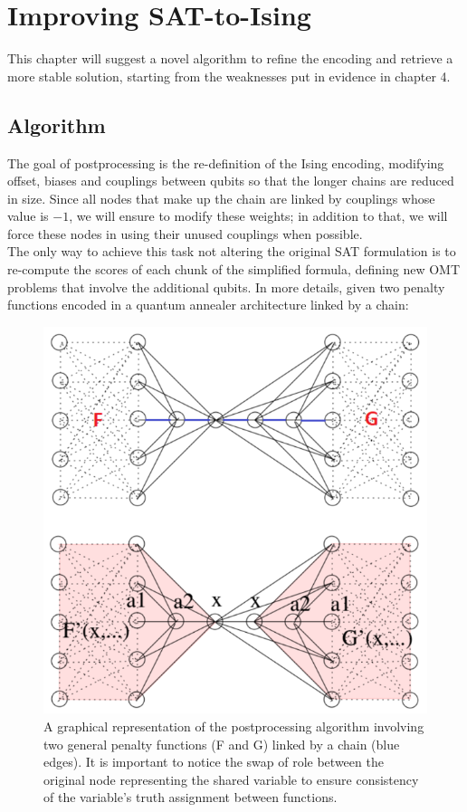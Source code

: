 \chapter{Improving SAT-to-Ising}
\label{cha:QAcore}

This chapter will suggest a novel algorithm to refine the encoding and retrieve a more stable solution, starting from the weaknesses put in evidence in chapter 4. 

\section{Algorithm}

The goal of postprocessing is the re-definition of the Ising encoding, modifying offset, biases and couplings between qubits so that the longer chains are reduced in size. Since all nodes that make up the chain are linked by couplings whose value is $-1$, we will ensure to modify these weights; in addition to that, we will force these nodes in using their unused couplings when possible. \\
The only way to achieve this task not altering the original SAT formulation is to re-compute the scores of each chunk of the simplified formula, defining new OMT problems that involve the additional qubits. In more details, given two penalty functions encoded in a quantum annealer architecture linked by a chain:
\begin{figure}[t]
	\begin{center}
	\includegraphics[]{images/Immaginetesi.png}
	\caption{A graphical representation of the postprocessing algorithm involving two general penalty functions (F and G) linked by a chain (blue edges). It is important to notice the swap of role between the original node representing the shared variable to ensure consistency of the variable's truth assignment between functions.}
	\end{center}
\end{figure}

